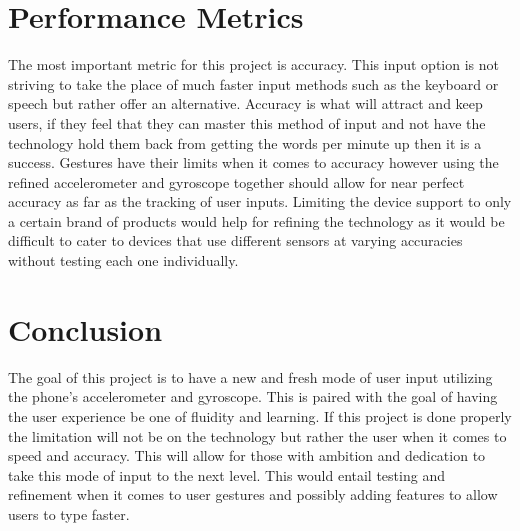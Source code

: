 \documentclass[onecolumn, draftclsnofoot,10pt, compsoc]{IEEEtran}
\begin{document}
\section{Performance Metrics}

The most important metric for this project is accuracy. This input option is not striving to take the place of much faster input methods such as the keyboard or speech but rather offer an alternative. Accuracy is what will attract and keep users, if they feel that they can master this method of input and not have the technology hold them back from getting the words per minute up then it is a success. Gestures have their limits when it comes to accuracy however using the refined accelerometer and gyroscope together should allow for near perfect accuracy as far as the tracking of user inputs. Limiting the device support to only a certain brand of products would help for refining the technology as it would be difficult to cater to devices that use different sensors at varying accuracies without testing each one individually.

\section{Conclusion}

The goal of this project is to have a new and fresh mode of user input utilizing the phone’s accelerometer and gyroscope. This is paired with the goal of having the user experience be one of fluidity and learning. If this project is done properly the limitation will not be on the technology but rather the user when it comes to speed and accuracy. This will allow for those with ambition and dedication to take this mode of input to the next level. This would entail testing and refinement when it comes to user gestures and possibly adding features to allow users to type faster.
\end{document}
